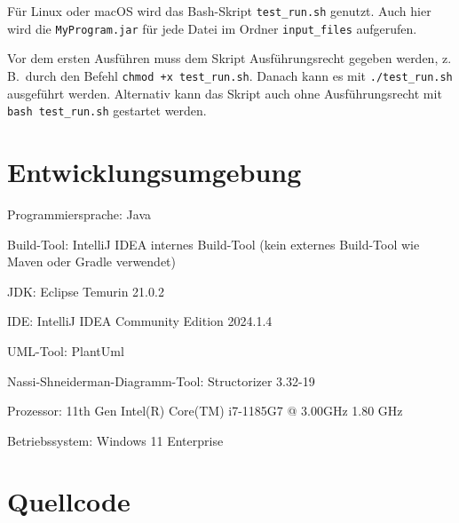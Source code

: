 \documentclass[a4paper,12pt]{report}
\begin{document}
Für Linux oder macOS wird das Bash-Skript \texttt{test\_run.sh} genutzt. Auch hier wird die \texttt{MyProgram.jar} für jede Datei im Ordner \texttt{input\_files} aufgerufen.

Vor dem ersten Ausführen muss dem Skript Ausführungsrecht gegeben werden, z.\,B.\ durch den Befehl \texttt{chmod +x test\_run.sh}. Danach kann es mit \texttt{./test\_run.sh} ausgeführt werden.
Alternativ kann das Skript auch ohne Ausführungsrecht mit \texttt{bash test\_run.sh} gestartet werden.


\chapter{Entwicklungsumgebung}
Programmiersprache: Java

Build-Tool: IntelliJ IDEA internes Build-Tool (kein externes Build-Tool wie Maven oder Gradle verwendet)

JDK: Eclipse Temurin 21.0.2

IDE: IntelliJ IDEA Community Edition 2024.1.4

UML-Tool: PlantUml

Nassi-Shneiderman-Diagramm-Tool: Structorizer 3.32-19

Prozessor: 11th Gen Intel(R) Core(TM) i7-1185G7 @ 3.00GHz   1.80 GHz 

Betriebssystem: Windows 11 Enterprise

\chapter{Quellcode}

\end{document}
